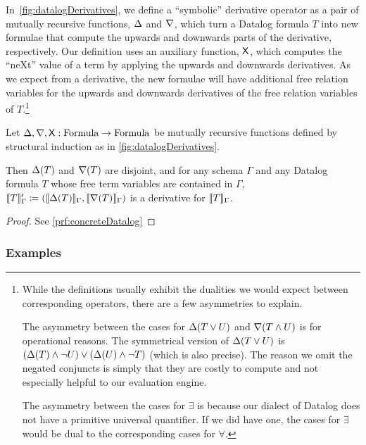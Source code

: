 In~\cref{fig:datalogDerivatives}, we define a ``symbolic'' derivative operator as a pair of mutually recursive functions,
$\Delta$ and $\nabla$, which turn a Datalog formula $T$ into new formulae that compute
the upwards and downwards parts of the derivative, respectively. 
Our definition uses an auxiliary function, ${\mathsf X}$, which computes the ``neXt'' value of a term by applying the upwards and downwards derivatives.
As we expect
from a derivative, the new formulae will have additional free relation variables
for the upwards and downwards derivatives of the free relation variables of $T$.\footnote{
While the definitions usually exhibit the dualities we would expect
  between corresponding operators, there are a few asymmetries to explain.

  The asymmetry between the cases for $\Delta(T \vee U)$ and
  $\nabla(T \wedge U)$ is for operational reasons. The symmetrical version of
  $\Delta(T \vee U)$ is $(\Delta(T) \wedge \neg U) \vee (\Delta(U) \wedge \neg
  T)$ (which is also precise). The reason we omit the negated conjuncts is simply
  that they are costly to compute and not especially helpful to our evaluation engine.

  The asymmetry between the cases for $\exists$ is because our
  dialect of Datalog does not have a primitive universal quantifier.
  If we did have one, the cases for $\exists$ would be dual to the corresponding
  cases for $\forall$.}

\newcommand{\bothchanges}{\rho}
\begin{thm}[name=Concrete Datalog formula derivatives, restate=concreteDatalog]
\label{thm:concreteDatalog}
  Let $\Delta, \nabla, {\mathsf X} : \mathrm{Formula} \rightarrow \mathrm{Formula}$ be mutually recursive functions
  defined by structural induction as in \cref{fig:datalogDerivatives}.

  Then $\Delta(T)$ and $\nabla(T)$ are disjoint, and for any schema $\Gamma$
  and any Datalog formula $T$ whose free term variables are contained in $\Gamma$,
  $\llbracket T \rrbracket_\Gamma' \coloneqq (\llbracket \Delta(T) \rrbracket_\Gamma, \llbracket \nabla(T) \rrbracket_\Gamma)$
  is a derivative for $\llbracket T \rrbracket_\Gamma$.
\end{thm}
\ifproofs
\begin{proof}
  See \cref{prf:concreteDatalog}
\end{proof}
\fi

\subsubsection{Examples}

